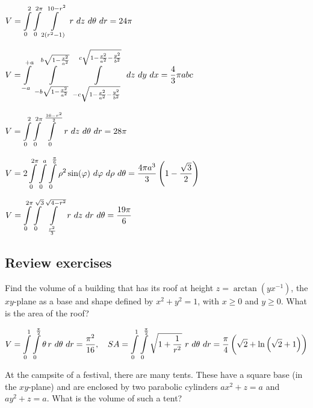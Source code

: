 \begin{Answer}
    
        \Question $V = \displaystyle\int\limits_0^2\int\limits_0^{2\pi}\int\limits_{2\left(r^2-1\right)}^{10-r^2} \, r\ dz\ d\theta \ dr =  24\pi$
        
        \Question $V = \ds\int\limits_{-a}^{+a} \ \ds\int\limits_{-b\sqrt{1 - \frac{x^2}{a^2}}}^{b\sqrt{1 - \frac{x^2}{a^2}}} \ \ds\int\limits_{-c\sqrt{1 - \frac{x^2}{a^2} - \frac{y^2}{b^2}}}^{c\sqrt{1 - \frac{x^2}{a^2} - \frac{y^2}{b^2}}} \ dz \ dy \ dx = \dfrac{4}{3} \pi a b c $
        
        \Question $V = \displaystyle \int\limits_0^2\int\limits_0^{2\pi}\int\limits_0^{\frac{16-r^2}{2}} \, r \ dz \ d\theta \ dr =  28\pi$
        
        \Question $V = 2\ds \int\limits_0^{2\pi} \int\limits_0^a  \int\limits_0^{\frac{\pi}{6}} \rho^2 \sin(\varphi) \ d\varphi \ d\rho \ d\theta = \dfrac{4\pi a^3}{3}\left(1-\dfrac{\sqrt{3}}{2}\right)$
        
        \Question $V = \displaystyle\int\limits_0^{2\pi}\int\limits_0^{\sqrt{3}}\int\limits_{\frac{r^2}{3}}^{\sqrt{4-r^2}} \, r\ dz\ dr \ d\theta = \dfrac{19\pi}{6}$
        
    
\end{Answer}

\subsection*{Review exercises}
\begin{Exercise}[difficulty = 3] Find the volume of a building that has its roof at height $z=\arctan \left( yx^{-1} \right)$, the $xy$-plane as a base and  shape defined by $x^2+y^2=1$, with $x \geq 0$ and $y \geq 0$. What is the area of the roof? 
\end{Exercise}

\begin{Answer}
    $V = \ds \int\limits_0^1 \int\limits_0^{\frac{\pi}{2}} \theta \, r\ d\theta \ dr = \dfrac{\pi^2}{16}, \quad SA = \ds \int\limits_0^1 \int\limits_0^{\frac{\pi}{2}} \sqrt{1 + \dfrac{1}{r^2}}\ r \ d\theta \ dr =  \dfrac{\pi}{4}\left( \sqrt{2} + \ln \left(\sqrt{2}+1\right) \right) $
\end{Answer}

\begin{Exercise}[difficulty = 3] At the campsite of a festival, there are many tents. These have a square base (in the $xy$-plane) and are enclosed by two  parabolic cylinders $ax^2+z=a$ and $ay^2+z=a$. What is the volume of such a tent?
\end{Exercise}


